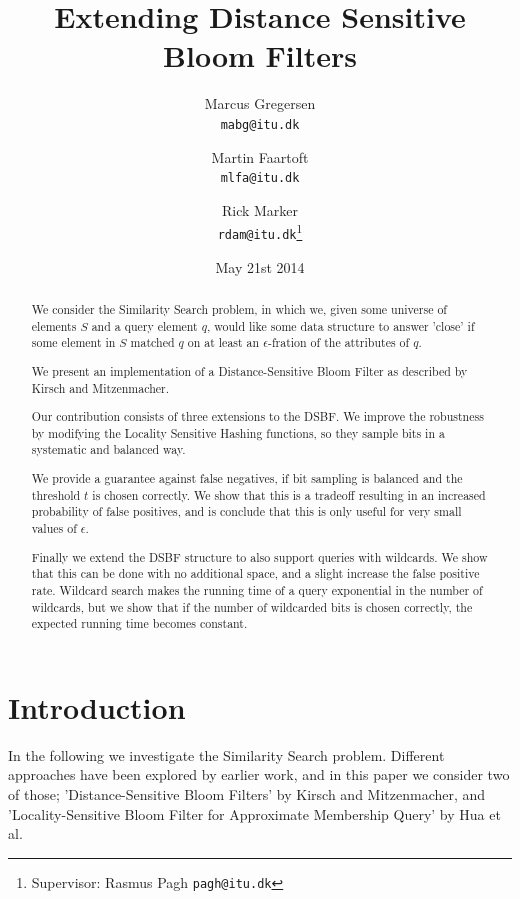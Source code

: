 \documentclass[a4paper,11pt]{article}
\begin{document}
\graphicspath{ {./images/} }
\date{May 21st 2014}
\title{Extending Distance Sensitive Bloom Filters}

\author{Marcus Gregersen\\
\texttt{mabg@itu.dk}
\and Martin Faartoft\\
\texttt{mlfa@itu.dk}
\and Rick Marker\\
\texttt{rdam@itu.dk}\thanks{Supervisor: Rasmus Pagh \texttt{pagh@itu.dk}}}
\clearpage\maketitle
\thispagestyle{empty}
\setcounter{page}{1}
\begin{abstract}
We consider the Similarity Search problem, in which we, given some universe of elements $S$ and a query element $q$, would like some data structure to answer 'close' if some element in $S$ matched $q$ on at least an $\epsilon$-fration of the attributes of $q$.

We present an implementation of a Distance-Sensitive Bloom Filter as described by Kirsch and Mitzenmacher\cite{paper:harvard}.

Our contribution consists of three extensions to the DSBF. We improve the robustness by modifying the Locality Sensitive Hashing functions, so they sample bits in a systematic and balanced way.

We provide a guarantee against false negatives, if bit sampling is balanced and the threshold $t$ is chosen correctly. We show that this is a tradeoff resulting in an increased probability of false positives, and is conclude that this is only useful for very small values of $\epsilon$.


Finally we extend the DSBF structure to also support queries with wildcards. We show that this can be done with no additional space, and a slight increase the false positive rate. Wildcard search makes the running time of a query exponential in the number of wildcards, but we show that if the number of wildcarded bits is chosen correctly, the expected running time becomes constant.
\end{abstract}

\newpage
\setcounter{page}{1}

\section{Introduction}
In the following we investigate the Similarity Search problem. Different approaches have been explored by earlier work, and in this paper we consider two of those; 'Distance-Sensitive Bloom Filters'\cite{paper:harvard} by Kirsch and Mitzenmacher, and 'Locality-Sensitive Bloom Filter for Approximate Membership Query'\cite{paper:hua} by Hua et al.
\end{document}

